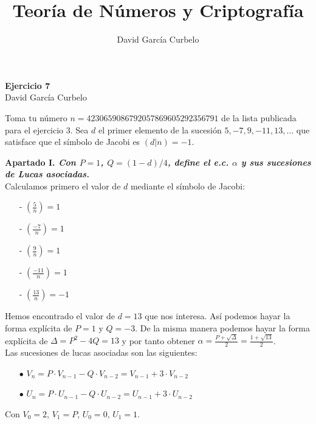 \documentclass[fleqn]{article}
\author{David García Curbelo}
\title{Teoría de Números y Criptografía}
\begin{document}
    \begin{center}
        \LARGE{\textbf{Ejercicio 7}} \\
        \Large{David García Curbelo} \\
    \end{center}

    \vspace{1cm}
    Toma tu número $n=4230659086792057869605292356791$ de la lista publicada para el ejercicio 3. Sea $d$ el 
    primer elemento de la sucesión $5, -7, 9, -11, 13, \dots$ que satisface que el símbolo de Jacobi es $(d|n) = -1$.


    \textbf{Apartado I. \textit{Con $P=1$, $Q = (1-d)/4$, define el e.c. $\alpha$ y sus sucesiones de Lucas asociadas.}}\\
    Calculamos primero el valor de $d$ mediante el símbolo de Jacobi:

    \begin{enumerate}
        \item[-] $\left(\frac{5}{n}\right) = 1$
        \item[-] $\left(\frac{-7}{n}\right) = 1$
        \item[-] $\left(\frac{9}{n}\right) = 1$
        \item[-] $\left(\frac{-11}{n}\right) = 1$
        \item[-] $\left(\frac{13}{n}\right) = -1$   
    \end{enumerate}

    Hemos encontrado el valor de $d = 13$ que nos interesa. Así podemos hayar la forma explícita de $P = 1$ y $Q = -3$.
    De la misma manera podemos hayar la forma explícita de $\Delta = P^2 - 4Q = 13$ y por tanto obtener
    $\alpha = \frac{P + \sqrt{\Delta}}{2} = \frac{1 + \sqrt{13}}{2}$. \\
    Las sucesiones de lucas asociadas son las siguientes:
    \begin{enumerate}
        \item[$\bullet$] $V_n = P \cdot V_{n-1} - Q \cdot V_{n-2} = V_{n-1} + 3 \cdot V_{n-2}$ \\ 
        \item[$\bullet$] $U_n = P \cdot U_{n-1} - Q \cdot U_{n-2} = U_{n-1} + 3 \cdot U_{n-2}$ \\
    \end{enumerate}
    Con $V_0 = 2$, $V_1 = P$, $U_0 = 0$, $U_1 = 1$.
\end{document}
